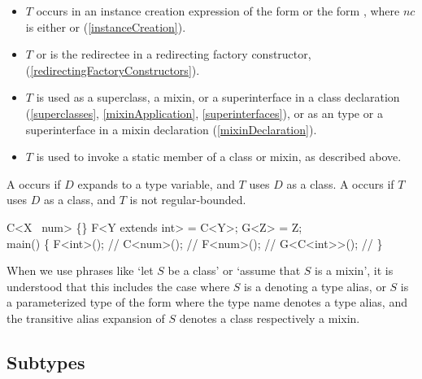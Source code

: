 \documentclass[makeidx]{article}
\begin{document}
{\begin{itemize}
\item
  $T$ occurs in an instance creation expression of the form
   or the form ,
  where $nc$ is either \NEW{} or \CONST{}
  (\ref{instanceCreation}).
\item
  $T$ or  is the redirectee in a redirecting factory constructor,
  (\ref{redirectingFactoryConstructors}).
\item
  $T$ is used as a superclass, a mixin, or a superinterface
  in a class declaration
  (\ref{superclasses}, \ref{mixinApplication}, \ref{superinterfaces}),
  or as an \ON{} type or a superinterface in a mixin declaration
  (\ref{mixinDeclaration}).
\item
  $T$ is used to invoke a static member of a class or mixin,
  as described above.
\end{itemize}

\LMHash{}%
A  occurs if $D$ expands to a type variable,
and $T$ uses $D$ as a class.
A  occurs if $T$ uses $D$ as a class,
and $T$ is not regular-bounded.

\begin{dartCode}
\CLASS{} C<X \EXTENDS\ num> \{\}
\TYPEDEF{} F<Y extends int> = C<Y>;
\TYPEDEF{} G<Z> = Z;
\\
\VOID{} main() \{
  F<int>(); // 
  C<num>(); // 
  F<num>(); // 
  G<C<int>{}>(); // 
\}
\end{dartCode}

\LMHash{}%
When we use phrases like `let $S$ be a class' or `assume that $S$ is a mixin',
it is understood that this includes the case where
$S$ is a  denoting a type alias, or
$S$ is a parameterized type of the form
where the type name denotes a type alias,
and the transitive alias expansion of $S$ denotes a class respectively a mixin.


\subsection{Subtypes}

}
\end{document}
